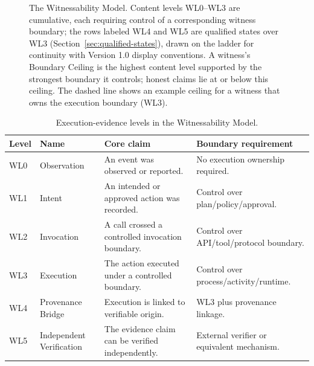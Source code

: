\documentclass[11pt]{article}
\begin{document}
\begin{figure}[t]
{
}
\caption{The Witnessability Model. Content levels WL0--WL3 are cumulative, each requiring control of a corresponding witness boundary; the rows labeled WL4 and WL5 are qualified states over WL3 (Section~\ref{sec:qualified-states}), drawn on the ladder for continuity with Version 1.0 display conventions. A witness's Boundary Ceiling is the highest content level supported by the strongest boundary it controls; honest claims lie at or below this ceiling. The dashed line shows an example ceiling for a witness that owns the execution boundary (WL3).}
\label{fig:boundary-ceiling}
\end{figure}

\begin{table}[h]
\centering
\small
\begin{tabularx}{\textwidth}{@{}P{0.08\textwidth}P{0.20\textwidth}Y Y@{}}
\toprule
Level & Name & Core claim & Boundary requirement \\
\midrule
WL0 & Observation & An event was observed or reported. & No execution ownership required. \\
WL1 & Intent & An intended or approved action was recorded. & Control over plan/policy/approval. \\
WL2 & Invocation & A call crossed a controlled invocation boundary. & Control over API/tool/protocol boundary. \\
WL3 & Execution & The action executed under a controlled boundary. & Control over process/activity/runtime. \\
WL4 & Provenance Bridge & Execution is linked to verifiable origin. & WL3 plus provenance linkage. \\
WL5 & Independent Verification & The evidence claim can be verified independently. & External verifier or equivalent mechanism. \\
\bottomrule
\end{tabularx}
\caption{Execution-evidence levels in the Witnessability Model.}
\end{table}
\end{document}
